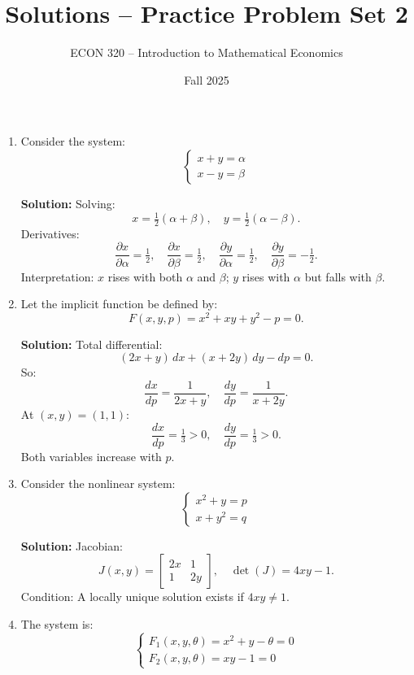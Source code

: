 \documentclass[12pt]{article}
\title{Solutions -- Practice Problem Set 2}
\author{ECON 320 -- Introduction to Mathematical Economics}
\date{Fall 2025}
\begin{document}
\maketitle

\begin{enumerate}


\item Consider the system:
\[
\begin{cases}
x + y = \alpha \\
x - y = \beta
\end{cases}
\]

\textbf{Solution:}  
Solving:
\[
x = \tfrac{1}{2}(\alpha + \beta), \quad y = \tfrac{1}{2}(\alpha - \beta).
\]
Derivatives:
\[
\frac{\partial x}{\partial \alpha} = \tfrac{1}{2}, \quad
\frac{\partial x}{\partial \beta} = \tfrac{1}{2}, \quad
\frac{\partial y}{\partial \alpha} = \tfrac{1}{2}, \quad
\frac{\partial y}{\partial \beta} = -\tfrac{1}{2}.
\]
Interpretation: $x$ rises with both $\alpha$ and $\beta$; $y$ rises with $\alpha$ but falls with $\beta$.



\item
Let the implicit function be defined by:
\[
F(x,y,p) = x^2 + xy + y^2 - p = 0.
\]

\textbf{Solution:}  
Total differential:
\[
(2x+y)\,dx + (x+2y)\,dy - dp = 0.
\]
So:
\[
\frac{dx}{dp} = \frac{1}{2x+y}, \quad \frac{dy}{dp} = \frac{1}{x+2y}.
\]
At $(x,y)=(1,1)$:
\[
\frac{dx}{dp} = \tfrac{1}{3} > 0, \quad \frac{dy}{dp} = \tfrac{1}{3} > 0.
\]
Both variables increase with $p$.



\item
Consider the nonlinear system:
\[
\begin{cases}
x^2 + y = p \\
x + y^2 = q
\end{cases}
\]

\textbf{Solution:}  
Jacobian:
\[
J(x,y) =
\begin{bmatrix}
2x & 1 \\
1 & 2y
\end{bmatrix}, \quad
\det(J) = 4xy - 1.
\]
Condition: A locally unique solution exists if $4xy \neq 1$.



\item 
The system is:
\[
\begin{cases}
F_1(x,y,\theta) = x^2 + y - \theta = 0 \\
F_2(x,y,\theta) = xy - 1 = 0
\end{cases}
\]


\end{enumerate}
\end{document}
